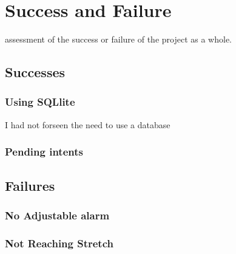 \section{Success and Failure}\label{success-and-failure}

assessment of the success or failure of the project as a whole.

\subsection{Successes}\label{successes}

\subsubsection{Using SQLlite}\label{using-sqllite}

I had not forseen the need to use a database

\subsubsection{Pending intents}\label{pending-intents}

\subsection{Failures}\label{failures}

\subsubsection{No Adjustable alarm}\label{no-adjustable-alarm}

\subsubsection{Not Reaching Stretch}\label{not-reaching-stretch}
